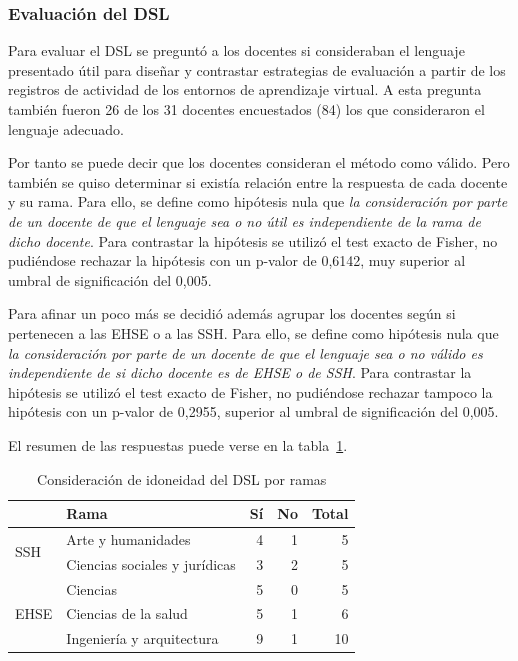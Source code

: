 \subsubsection{Evaluación del DSL}

Para evaluar el DSL se preguntó a los docentes si consideraban el lenguaje presentado útil para diseñar y contrastar estrategias de evaluación a partir de los registros de actividad de los entornos de aprendizaje virtual. A esta pregunta también fueron 26 de los 31 docentes encuestados (84\percentage) los que consideraron el lenguaje adecuado.

Por tanto se puede decir que los docentes consideran el método como válido. Pero también se quiso determinar si existía relación entre la respuesta de cada docente y su rama. Para ello, se define como hipótesis nula que \emph{la consideración por parte de un docente de que el lenguaje sea o no útil es independiente de la rama de dicho docente}. Para contrastar la hipótesis se utilizó el test exacto de Fisher, no pudiéndose rechazar la hipótesis con un p-valor de 0,6142, muy superior al umbral de significación del 0,005.

Para afinar un poco más se decidió además agrupar los docentes según si pertenecen a las EHSE o a  las SSH. Para ello, se define como hipótesis nula que \emph{la consideración por parte de un docente de que el lenguaje sea o no válido es independiente de si  dicho docente es de EHSE o de SSH}. Para contrastar la hipótesis se utilizó el test exacto de Fisher, no pudiéndose rechazar tampoco la hipótesis con un p-valor de 0,2955, superior al umbral de significación del 0,005.

El resumen de las respuestas puede verse en la tabla~\ref{tab:cap:encuesta:DSL:rama}.

\begin{table}
  \begin{center}
  \begin{tabular}{| l | l | r | r | r |}
    \hline
    & Rama & Sí & No & Total \\
    \hline
    \hline
    \multirow{2}{2.5cm}{SSH} & Arte y humanidades & 4 & 1 & 5  \\
    \cline{2-5}
    & Ciencias sociales y jurídicas & 3 & 2 & 5  \\
    \hline
    \multirow{3}{2.5cm}{EHSE} & Ciencias & 5 & 0 & 5  \\
    \cline{2-5}
    & Ciencias de la salud & 5 & 1 & 6  \\
    \cline{2-5}
    & Ingeniería y arquitectura & 9 & 1 & 10 \\
    \hline
  \end{tabular}
\end{center}
\caption{Consideración de idoneidad del DSL por ramas}
\label{tab:cap:encuesta:DSL:rama}
\end{table}

